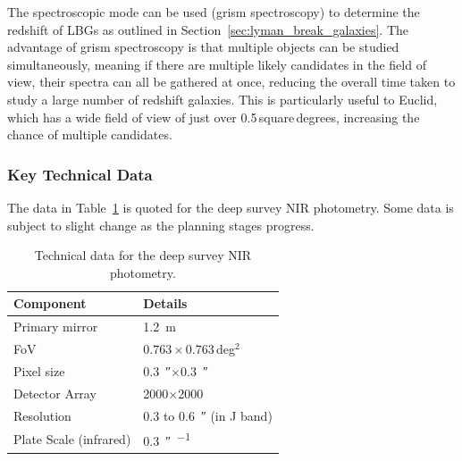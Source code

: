 		The spectroscopic mode can be used (grism spectroscopy) to determine the redshift of LBGs as outlined in Section~\ref{sec:lyman_break_galaxies}. The advantage of grism spectroscopy is that multiple objects can be studied simultaneously, meaning if there are multiple likely candidates in the field of view, their spectra can all be gathered at once, reducing the overall time taken to study a large number of redshift galaxies. This is particularly useful to Euclid, which has a wide field of view of just over 0.5\,square\,degrees, increasing the chance of multiple candidates.

	\subsubsection{Key Technical Data} %
	\label{ssub:key_technical_data}
		The data in Table~\ref{tab:Euclid_technical} is quoted for the deep survey NIR photometry. Some data is subject to slight change as the planning stages progress.
		\begin{table}[!htbp]
			\begin{center}
				\begin{tabular}{l|l}
					Component & Details \\
					\hline\hline
					Primary mirror		& \SI{1.2}{\metre} \\ \hline
					FoV 				& $0.763\times0.763$\,deg$^2$ \\ \hline
					Pixel size			& \SI{0.3}{\arcsecond}$\times$\SI{0.3}{\arcsecond} \\ \hline
					Detector Array		& \num{2000}$\times$\num{2000}\,\si{\pixel} \\ \hline
					Resolution 			& 0.3 to \SI{0.6}{\arcsecond} (in J band) \\ \hline
					Plate Scale (infrared)	& \SI{0.3}{\arcsecond\per\pixel}
				\end{tabular}
			\end{center}
			\caption{Technical data for the deep survey NIR photometry\cite{Euclid_Definition_Study_Report}.\label{tab:Euclid_technical}}
		\end{table}
